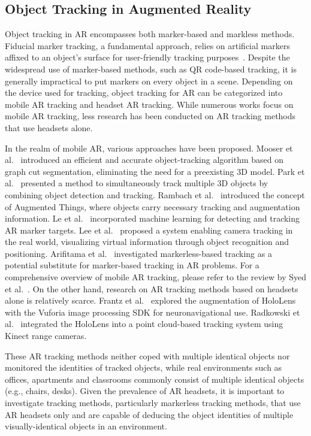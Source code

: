 \subsection{Object Tracking in Augmented Reality}

Object tracking in AR encompasses both marker-based and markless methods. Fiducial marker tracking, a fundamental approach, relies on artificial markers affixed to an object's surface for user-friendly tracking purposes~\cite{kato1999marker}. Despite the widespread use of marker-based methods, such as QR code-based tracking, it is generally impractical to put markers on every object in a scene. Depending on the device used for tracking, object tracking for AR can be categorized into mobile AR tracking and headset AR tracking. While numerous works focus on mobile AR tracking, less research has been conducted on AR tracking methods that use headsets alone.

In the realm of mobile AR, various approaches have been proposed. Mooser et al.~\cite{mooser2007real} introduced an efficient and accurate object-tracking algorithm based on graph cut segmentation, eliminating the need for a preexisting 3D model. Park et al.~\cite{park2008multiple} presented a method to simultaneously track multiple 3D objects by combining object detection and tracking. Rambach et al.~\cite{rambach2017poster} introduced the concept of Augmented Things, where objects carry necessary tracking and augmentation information. Le et al.~\cite{le2021augmented} incorporated machine learning for detecting and tracking AR marker targets. Lee et al.~\cite{lee2022study} proposed a system enabling camera tracking in the real world, visualizing virtual information through object recognition and positioning. Arifitama et al.~\cite{arifitama2021mobile} investigated markerless-based tracking as a potential substitute for marker-based tracking in AR problems. For a comprehensive overview of mobile AR tracking, please refer to the review by Syed et al.~\cite{syed2022depth}. On the other hand, research on AR tracking methods based on headsets alone is relatively scarce. Frantz et al.~\cite{frantz2018augmenting} explored the augmentation of HoloLens with the Vuforia image processing SDK for neuronavigational use. Radkowski et al.~\cite{radkowski2018hololens} integrated the HoloLens into a point cloud-based tracking system using Kinect range cameras.

These AR tracking methods neither coped with multiple identical objects nor monitored the identities of tracked objects, while real environments such as offices, apartments and classrooms commonly consist of multiple identical objects (e.g., chairs, desks). Given the prevalence of AR headsets, it is important to investigate tracking methods, particularly markerless tracking methods, that use AR headsets only and are capable of deducing the object identities of multiple visually-identical objects in an environment.